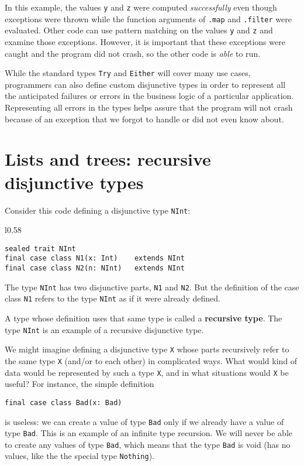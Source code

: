 \noindent In this example, the values \lstinline!y! and \lstinline!z!
were computed \emph{successfully} even though exceptions were thrown
while the function arguments of \lstinline!.map! and \lstinline!.filter!
were evaluated. Other code can use pattern matching on the values
\lstinline!y! and \lstinline!z! and examine those exceptions. However,
it is important that these exceptions were caught and the program
did not crash, so the other code is \emph{able} to run. 

While the standard types \lstinline!Try! and \lstinline!Either!
will cover many use cases, programmers can also define custom disjunctive
types in order to represent all the anticipated failures or errors
in the business logic of a particular application. Representing all
errors in the types helps assure that the program will not crash because
of an exception that we forgot to handle or did not even know about.

\section{Lists and trees: recursive disjunctive types\label{sec:Lists-and-trees:recursive-disjunctive-types}}

Consider this code defining a disjunctive type \lstinline!NInt!:

\begin{wrapfigure}{l}{0.58\columnwidth}%
\vspace{-0.75\baselineskip}

\begin{lstlisting}
sealed trait NInt
final case class N1(x: Int)    extends NInt
final case class N2(n: NInt)   extends NInt
\end{lstlisting}
\vspace{-0.75\baselineskip}
\end{wrapfigure}%

\noindent The type \lstinline!NInt! has two disjunctive parts, \lstinline!N1!
and \lstinline!N2!. But the definition of the case class \lstinline!N1!
refers to the type \lstinline!NInt! as if it were already defined. 

A type whose definition uses that same type is called a \textbf{recursive
type}. The type \lstinline!NInt! is an example of a recursive disjunctive
type.

We might imagine defining a disjunctive type \lstinline!X! whose
parts recursively refer to the same type \lstinline!X! (and/or to
each other) in complicated ways. What would kind of data would be
represented by such a type \lstinline!X!, and in what situations
would \lstinline!X! be useful? For instance, the simple definition
\begin{lstlisting}
final case class Bad(x: Bad)
\end{lstlisting}
is useless: we can create a value of type \lstinline!Bad! only if
we already have a value of type \lstinline!Bad!. This is an example
of an infinite type recursion. We
will never be able to create any values of type \lstinline!Bad!,
which means that the type \lstinline!Bad! is void
(has no values, like the the special type \lstinline!Nothing!). 

